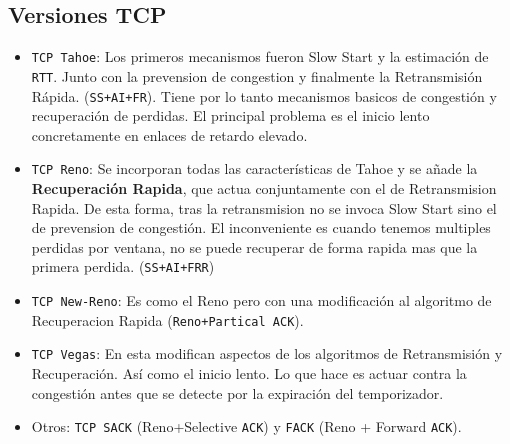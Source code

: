 \subsection*{Versiones TCP}
\begin{itemize}
\item \texttt{TCP Tahoe}: Los primeros mecanismos fueron Slow Start y la estimación de \texttt{RTT}. Junto con la prevension de congestion y finalmente la Retransmisión Rápida. (\texttt{SS+AI+FR}). Tiene por lo tanto mecanismos basicos de congestión y recuperación de perdidas. El principal problema es el inicio lento concretamente en enlaces de retardo elevado.
\item \texttt{TCP Reno}: Se incorporan todas las características de Tahoe y se añade la \textbf{Recuperación Rapida}, que actua conjuntamente con el de Retransmision Rapida. De esta forma, tras la retransmision no se invoca Slow Start sino el de prevension de congestión. El inconveniente es cuando tenemos multiples perdidas por ventana, no se puede recuperar de forma rapida mas que la primera perdida. (\texttt{SS+AI+FRR})
\item \texttt{TCP New-Reno}: Es como el Reno pero con una modificación al algoritmo de Recuperacion Rapida (\texttt{Reno+Partical ACK}).
\item \texttt{TCP Vegas}: En esta modifican aspectos de los algoritmos de Retransmisión y Recuperación. Así como el inicio lento. Lo que hace es actuar contra la congestión antes que se detecte por la expiración del temporizador.
\item Otros: \texttt{TCP SACK} (Reno+Selective \texttt{ACK}) y \texttt{FACK} (Reno + Forward \texttt{ACK}).
\end{itemize} 
 

 


